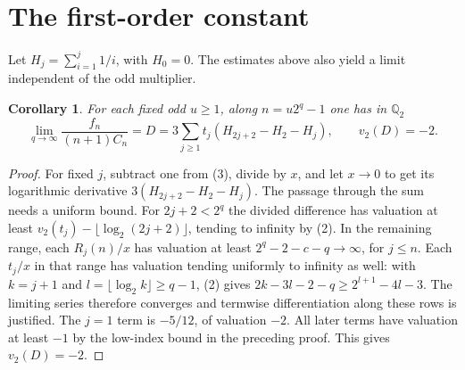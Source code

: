 \documentclass[11pt]{article}
\newtheorem{corollary}[theorem]{Corollary}
\newcommand{\ord}{v_2}
\newcommand{\Q}{\mathbb Q}
\begin{document}
\section{The first-order constant}
Let $H_j=\sum_{i=1}^j1/i$, with $H_0=0$. The estimates above also yield a limit independent of the odd multiplier.
\begin{corollary}\label{derivative}
For each fixed odd $u\ge1$, along $n=u2^q-1$ one has in $\Q_2$
\[
 \lim_{q\to\infty}\frac{f_n}{(n+1)C_n}
 = D= 3\sum_{j\ge1}t_j(H_{2j+2}-H_2-H_j),\qquad \ord(D)=-2 .
\]
\end{corollary}
\begin{proof}
For fixed $j$, subtract one from (3), divide by $x$, and let $x\to0$ to get its logarithmic derivative $3(H_{2j+2}-H_2-H_j)$. The passage through the sum needs a uniform bound. For $2j+2<2^q$ the divided difference has valuation at least $\ord(t_j)-\lfloor\log_2(2j+2)\rfloor$, tending to infinity by (2). In the remaining range, each $R_j(n)/x$ has valuation at least $2^q-2-c-q\to\infty$, for $j\le n$. Each $t_j/x$ in that range has valuation tending uniformly to infinity as well: with $k=j+1$ and $l=\lfloor\log_2 k\rfloor\ge q-1$, (2) gives $2k-3l-2-q\ge 2^{l+1}-4l-3$. The limiting series therefore converges and termwise differentiation along these rows is justified. The $j=1$ term is $-5/12$, of valuation $-2$. All later terms have valuation at least $-1$ by the low-index bound in the preceding proof. This gives $\ord(D)=-2$.
\end{proof}
\end{document}
